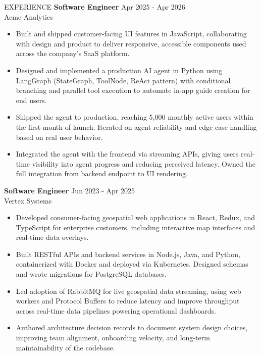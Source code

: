 
\begin{rSection}{EXPERIENCE}
\textbf{Software Engineer} \hfill Apr 2025 - Apr 2026\\
Acme Analytics
 \begin{itemize}
    \itemsep 3pt {}
    \item Built and shipped customer-facing UI features in JavaScript, collaborating with design and product to deliver responsive, accessible components used across the company's SaaS platform.
    \item Designed and implemented a production AI agent in Python using LangGraph (StateGraph, ToolNode, ReAct pattern) with conditional branching and parallel tool execution to automate in-app guide creation for end users.
    \item Shipped the agent to production, reaching 5,000 monthly active users within the first month of launch. Iterated on agent reliability and edge case handling based on real user behavior.
    \item Integrated the agent with the frontend via streaming APIs, giving users real-time visibility into agent progress and reducing perceived latency. Owned the full integration from backend endpoint to UI rendering.
 \end{itemize}
\textbf{Software Engineer} \hfill Jun 2023 - Apr 2025\\
Vertex Systems
 \begin{itemize}
    \itemsep 3pt {}
    \item Developed consumer-facing geospatial web applications in React, Redux, and TypeScript for enterprise customers, including interactive map interfaces and real-time data overlays.
    \item Built RESTful APIs and backend services in Node.js, Java, and Python, containerized with Docker and deployed via Kubernetes. Designed schemas and wrote migrations for PostgreSQL databases.
    \item Led adoption of RabbitMQ for live geospatial data streaming, using web workers and Protocol Buffers to reduce latency and improve throughput across real-time data pipelines powering operational dashboards.
    \item Authored architecture decision records to document system design choices, improving team alignment, onboarding velocity, and long-term maintainability of the codebase.

\end{itemize}
\end{rSection}

